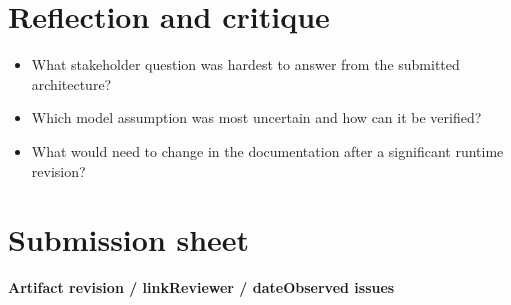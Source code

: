 \documentclass[10pt,letterpaper]{article}
\begin{document}
\section{Reflection and critique}
\begin{itemize}
\item What stakeholder question was hardest to answer from the submitted architecture?
\item Which model assumption was most uncertain and how can it be verified?
\item What would need to change in the documentation after a significant runtime revision?
\end{itemize}
\section{Submission sheet}
\textbf{Artifact revision / link}\textbf{Reviewer / date}\textbf{Observed issues}
\end{document}
